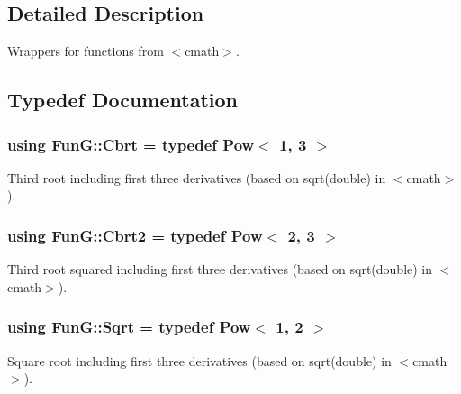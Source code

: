 \subsection{Detailed Description}
Wrappers for functions from $<$cmath$>$. 

\subsection{Typedef Documentation}
\hypertarget{group__CMathGroup_gaff369d639f7a316b3f22982e806cb45f}{
\subsubsection[{Cbrt}]{\setlength{\rightskip}{0pt plus 5cm}using {\bf Fun\-G\-::\-Cbrt} = typedef Pow$<$ 1, 3 $>$}}\label{group__CMathGroup_gaff369d639f7a316b3f22982e806cb45f}


Third root including first three derivatives (based on sqrt(double) in $<$cmath$>$). 

\hypertarget{group__CMathGroup_gab63795eecd1e9a55ea26b24125053f2d}{
\subsubsection[{Cbrt2}]{\setlength{\rightskip}{0pt plus 5cm}using {\bf Fun\-G\-::\-Cbrt2} = typedef Pow$<$ 2, 3 $>$}}\label{group__CMathGroup_gab63795eecd1e9a55ea26b24125053f2d}


Third root squared including first three derivatives (based on sqrt(double) in $<$cmath$>$). 

\hypertarget{group__CMathGroup_ga70c69680e967f5ccb79c07e50d44739d}{
\subsubsection[{Sqrt}]{\setlength{\rightskip}{0pt plus 5cm}using {\bf Fun\-G\-::\-Sqrt} = typedef Pow$<$ 1, 2 $>$}}\label{group__CMathGroup_ga70c69680e967f5ccb79c07e50d44739d}


Square root including first three derivatives (based on sqrt(double) in $<$cmath$>$). 



